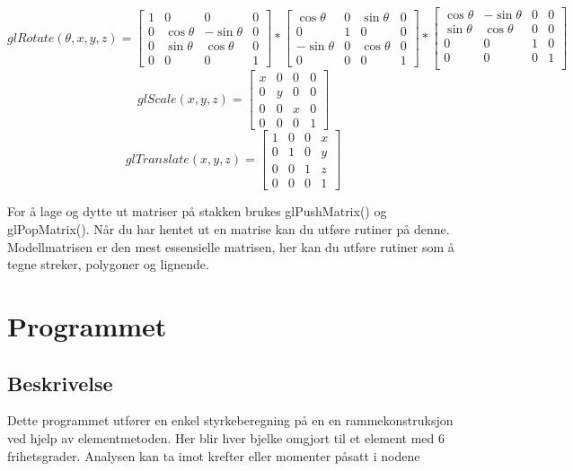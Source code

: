 \documentclass[10pt,a4paper, norsk]{article}
\begin{document}
\begin{equation}
glRotate(\theta	,x,y,z)  = \begin{bmatrix}
1 & 0&  0 &0 \\
0   &\cos \theta &  -\sin \theta &0\\
0 &  \sin \theta   & \cos \theta &0\\
0&0&0&1
\end{bmatrix} * \begin{bmatrix}
\cos \theta  & 0 &  \sin \theta &0\\
0  & 1  & 0 & 0\\
-\sin \theta &  0 &  \cos \theta  &0\\
0&0&0&1
\end{bmatrix} 
*
\begin{bmatrix}
\cos \theta & -\sin \theta &   0 &0\\[3pt]
\sin \theta & \cos \theta  & 0 &0\\[3pt]
0 &0 & 1 &0\\
0&0&0&1\\
\end{bmatrix}
\end{equation}
\begin{equation}
glScale(x,y,z)=
\begin{bmatrix}
x &0&0&0\\
0&y&0&0\\
0&0&x&0\\
0&0&0&1
\end{bmatrix}
\end{equation}
\begin{equation}
glTranslate(x,y,z)=
\begin{bmatrix}
1 &0&0&x\\
0&1&0&y\\
0&0&1&z\\
0&0&0&1
\end{bmatrix}
\end{equation}

For å lage og dytte ut matriser på stakken brukes glPushMatrix() og glPopMatrix(). Når du har hentet ut en matrise kan du utføre rutiner på denne. Modellmatrisen er den mest essensielle matrisen, her kan du utføre rutiner som å tegne streker, polygoner og lignende. 




\section{Programmet} 


\subsection{Beskrivelse}
Dette programmet utfører en enkel styrkeberegning på en en rammekonstruksjon ved hjelp av elementmetoden. Her blir hver bjelke omgjort til et element med 6 frihetsgrader. Analysen kan ta imot krefter eller momenter påsatt i nodene
\end{document}
